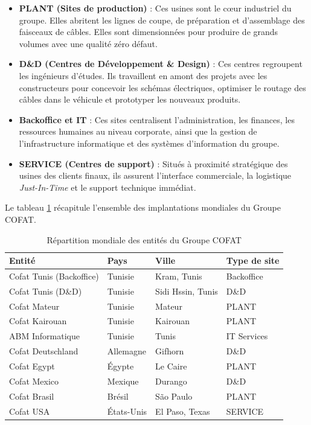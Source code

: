 \begin{itemize}
    \item \textbf{PLANT (Sites de production)} : Ces usines sont le cœur industriel du groupe. Elles abritent les lignes de coupe, de préparation et d'assemblage des faisceaux de câbles. Elles sont dimensionnées pour produire de grands volumes avec une qualité zéro défaut.
    \item \textbf{D\&D (Centres de Développement \& Design)} : Ces centres regroupent les ingénieurs d'études. Ils travaillent en amont des projets avec les constructeurs pour concevoir les schémas électriques, optimiser le routage des câbles dans le véhicule et prototyper les nouveaux produits.
    \item \textbf{Backoffice et IT} : Ces sites centralisent l'administration, les finances, les ressources humaines au niveau corporate, ainsi que la gestion de l'infrastructure informatique et des systèmes d'information du groupe.
    \item \textbf{SERVICE (Centres de support)} : Situés à proximité stratégique des usines des clients finaux, ils assurent l'interface commerciale, la logistique \textit{Just-In-Time} et le support technique immédiat.
\end{itemize}

Le tableau \ref{tab:cofat_sites} récapitule l'ensemble des implantations mondiales du Groupe COFAT.

\begin{table}[h]
\centering
\begin{tabular}{|l|l|l|l|}
\hline
\textbf{Entité} & \textbf{Pays} & \textbf{Ville} & \textbf{Type de site} \\ \hline
Cofat Tunis (Backoffice) & Tunisie & Kram, Tunis & Backoffice \\ \hline
Cofat Tunis (D\&D) & Tunisie & Sidi Hssin, Tunis & D\&D \\ \hline
Cofat Mateur & Tunisie & Mateur & PLANT \\ \hline
Cofat Kairouan & Tunisie & Kairouan & PLANT \\ \hline
ABM Informatique & Tunisie & Tunis & IT Services \\ \hline
Cofat Deutschland & Allemagne & Gifhorn & D\&D \\ \hline
Cofat Egypt & Égypte & Le Caire & PLANT \\ \hline
Cofat Mexico & Mexique & Durango & D\&D \\ \hline
Cofat Brasil & Brésil & São Paulo & PLANT \\ \hline
Cofat USA & États-Unis & El Paso, Texas & SERVICE \\ \hline
\end{tabular}
\caption{Répartition mondiale des entités du Groupe COFAT}
\label{tab:cofat_sites}
\end{table}

